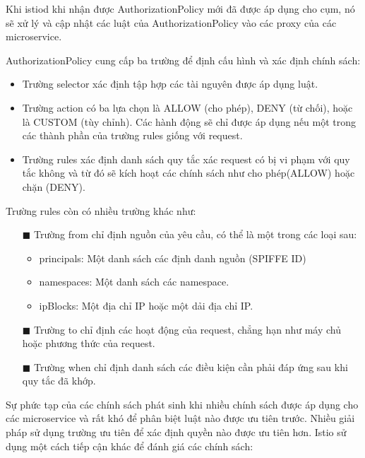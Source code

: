 \documentclass[12pt,a4paper]{report}
\begin{document}
{{			Khi istiod khi nhận được AuthorizationPolicy mới đã được áp dụng cho cụm, nó sẽ xử lý và cập nhật các luật của AuthorizationPolicy vào các proxy của các microservice.
			
			AuthorizationPolicy cung cấp ba trường để định cấu hình và xác định chính sách:
			
			\begin{itemize}
				\item Trường selector xác định tập hợp các tài nguyên được áp dụng luật.
				\item Trường action có ba lựa chọn là ALLOW (cho phép), DENY (từ chối), hoặc là CUSTOM (tùy chỉnh). Các hành động sẽ chỉ được áp dụng nếu một trong các thành phần của trường rules giống với request.
				\item Trường rules xác định danh sách quy tắc xác request có bị vi phạm với quy tắc không và từ đó sẽ kích hoạt các chính sách như cho phép(ALLOW) hoặc chặn (DENY).
			\end{itemize}
		
			Trường rules còn có nhiều trường khác như:
			\begin{enumerate}
				\item[$\blacksquare$] Trường from chỉ định nguồn của yêu cầu, có thể là một trong các loại sau:
				\begin{itemize}
					\item principals: Một danh sách các định danh nguồn (SPIFFE ID)
					\item namespaces: Một danh sách các namespace.
					\item ipBlocks: Một địa chỉ IP hoặc một dải địa chỉ IP.
				\end{itemize}
				\item[$\blacksquare$] Trường to chỉ định các hoạt động của request, chẳng hạn như máy chủ hoặc phương thức của request.
				\item[$\blacksquare$] Trường when chỉ định danh sách các điều kiện cần phải đáp ứng sau khi quy tắc đã khớp.
			\end{enumerate}
			
			Sự phức tạp của các chính sách phát sinh khi nhiều chính sách được áp dụng cho các microservice và rất khó để phân biệt luật nào được ưu tiên trước. Nhiều giải pháp sử dụng trường ưu tiên để xác định quyền nào được ưu tiên hơn. Istio sử dụng một cách tiếp cận khác để đánh giá các chính sách:
			
}}
\end{document}
